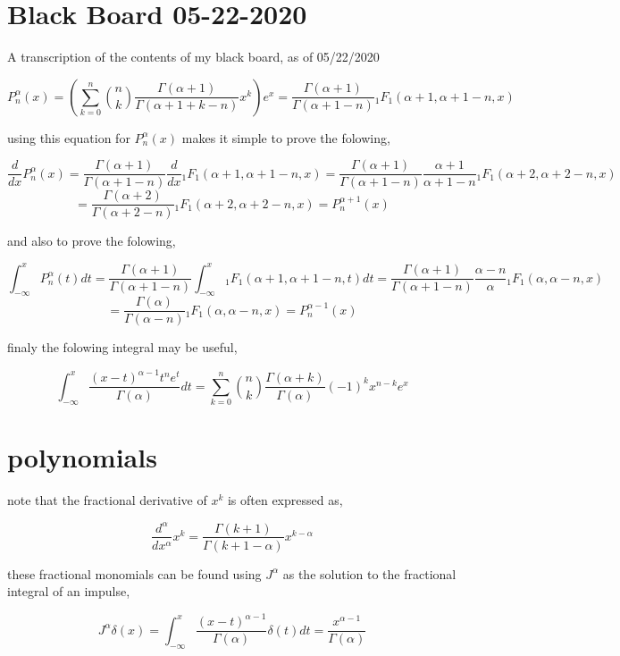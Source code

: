\documentclass[%
 preprint,
 amsmath, amssymb, aps, pra, 10pt
]{revtex4-2}
\begin{document}
\section{Black Board 05-22-2020}

A transcription of the contents of my black board, as of 05/22/2020

\[P_n^\alpha(x) = \left( \sum_{k=0}^n \binom{n}{k}\frac{\Gamma(\alpha + 1)}{\Gamma(\alpha + 1 + k - n)}x^k \right)e^x = \frac{\Gamma(\alpha + 1)}{\Gamma(\alpha + 1 -n)}{}_1F_1(\alpha + 1, \alpha + 1 -n, x)\]

using this equation for $P_n^\alpha(x)$ makes it simple to prove the folowing,

\[\frac{d}{dx}P_n^\alpha(x) = \frac{\Gamma(\alpha + 1)}{\Gamma(\alpha + 1 -n)}\frac{d}{dx}{}_1F_1(\alpha + 1, \alpha + 1 -n, x) = \frac{\Gamma(\alpha + 1)}{\Gamma(\alpha + 1 -n)}\frac{\alpha + 1}{\alpha + 1 - n}{}_1F_1(\alpha + 2, \alpha + 2 -n, x) \]\[= \frac{\Gamma(\alpha + 2)}{\Gamma(\alpha + 2 -n)}{}_1F_1(\alpha + 2, \alpha + 2 -n, x) = P_n^{\alpha + 1}(x)\]

and also to prove the folowing,

\[\int_{-\infty}^x P_n^\alpha(t)dt = \frac{\Gamma(\alpha + 1)}{\Gamma(\alpha + 1 -n)} \int_{-\infty}^x  {}_1F_1(\alpha + 1, \alpha + 1 -n, t)dt = \frac{\Gamma(\alpha + 1)}{\Gamma(\alpha + 1 -n)}\frac{\alpha - n}{\alpha}{}_1F_1(\alpha, \alpha -n, x) \]\[= \frac{\Gamma(\alpha)}{\Gamma(\alpha - n)}{}_1F_1(\alpha, \alpha - n, x) = P_n^{\alpha - 1}(x)\]

finaly the folowing integral may be useful,

\[\int_{-\infty}^x \frac{\left(x - t\right)^{\alpha - 1}t^ne^t}{\Gamma(\alpha)}dt = \sum_{k=0}^n \binom{n}{k}\frac{\Gamma(\alpha + k)}{\Gamma(\alpha)}(-1)^kx^{n - k}e^x\]

\section{polynomials}
note that the fractional derivative of $x^k$ is often expressed as,

\[\frac{d^\alpha}{dx^\alpha}x^k = \frac{\Gamma(k + 1)}{\Gamma(k + 1 - \alpha)}x^{k - \alpha}\]

these fractional monomials can be found using $J^\alpha$ as the solution to the fractional integral of an impulse,

\[J^\alpha\delta(x) = \int_{-\infty}^x \frac{\left(x - t\right)^{\alpha - 1}}{\Gamma(\alpha)}\delta(t)dt = \frac{x^{\alpha - 1}}{\Gamma(\alpha)}\]
\end{document}
